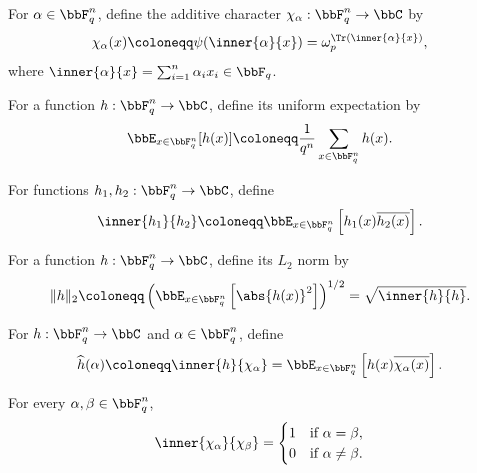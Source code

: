 \begin{definition}
\label{def:additive-character}
\leanok
For $\alpha\in\bbF_q^n$, define the additive character
$\chi_\alpha: \bbF_q^n\to\bbC$ by
\[
    \chi_\alpha(x) \coloneqq \psi(\inner{\alpha}{x})
    = \omega_p^{\Tr(\inner{\alpha}{x})},
\]
where $\inner{\alpha}{x}=\sum_{i=1}^n \alpha_i x_i\in\bbF_q$.
\end{definition}

\begin{definition}[Expectation]
\label{def:expectation}
\leanok
For a function $h:\bbF_q^n\to\bbC$, define its uniform expectation by
\[
    \bbE_{x\in\bbF_q^n}[h(x)]
    \coloneqq \frac{1}{q^n}\sum_{x\in\bbF_q^n} h(x).
\]
\end{definition}

\begin{definition}
\label{def:function-inner-product}
\leanok
For functions $h_1,h_2:\bbF_q^n\to\bbC$, define
\[
    \inner{h_1}{h_2}
    \coloneqq \bbE_{x\in\bbF_q^n}\left[h_1(x)\overline{h_2(x)}\right].
\]
\end{definition}

\begin{definition}[$L_2$ norm]
\label{def:function-l2-norm}
\leanok
For a function $h:\bbF_q^n\to\bbC$, define its $L_2$ norm by
\[
    \|h\|_2
    \coloneqq
    \left(\bbE_{x\in\bbF_q^n}\left[\abs{h(x)}^2\right]\right)^{1/2}
    =
    \sqrt{\inner{h}{h}}.
\]
\end{definition}

\begin{definition}
\label{def:fourier-coefficient}
\leanok
For $h:\bbF_q^n\to\bbC$ and $\alpha\in\bbF_q^n$, define
\[
    \widehat h(\alpha)
    \coloneqq \inner{h}{\chi_\alpha}
    = \bbE_{x\in\bbF_q^n}\left[h(x)\overline{\chi_\alpha(x)}\right].
\]
\end{definition}

\begin{lemma}
\label{lem:character-orthonormal}
\leanok
For every $\alpha,\beta\in\bbF_q^n$,
\[
    \inner{\chi_\alpha}{\chi_\beta}
    =
    \begin{cases}
        1 & \text{if } \alpha=\beta,\\
        0 & \text{if } \alpha\ne\beta.
    \end{cases}
\]
\end{lemma}

